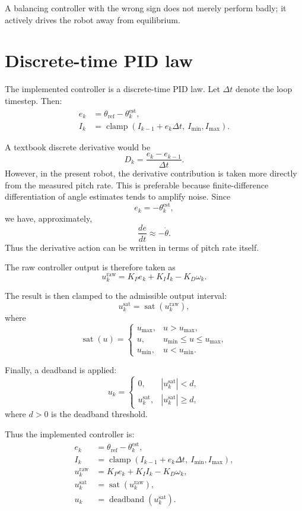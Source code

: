 \documentclass[11pt,a4paper]{article}
\begin{document}
A balancing controller with the wrong sign does not merely perform badly; it actively drives the robot away from equilibrium.

\section{Discrete-time PID law}

The implemented controller is a discrete-time PID law. Let \(\Delta t\) denote the loop timestep. Then:
\begin{align*}
e_k &= \theta_{\mathrm{ref}} - \theta^{\mathrm{est}}_k, \\[4pt]
I_k &= \operatorname{clamp}\!\left(I_{k-1} + e_k \Delta t,\ I_{\min}, I_{\max}\right).
\end{align*}

A textbook discrete derivative would be
\[
D_k = \frac{e_k - e_{k-1}}{\Delta t}.
\]
However, in the present robot, the derivative contribution is taken more directly from the measured pitch rate. This is preferable because finite-difference differentiation of angle estimates tends to amplify noise. Since
\[
e_k = -\theta^{\mathrm{est}}_k,
\]
we have, approximately,
\[
\frac{de}{dt} \approx -\dot{\theta}.
\]
Thus the derivative action can be written in terms of pitch rate itself.

The raw controller output is therefore taken as
\[
u_k^{\mathrm{raw}} = K_P e_k + K_I I_k - K_D \omega_k.
\]

The result is then clamped to the admissible output interval:
\[
u_k^{\mathrm{sat}} = \operatorname{sat}(u_k^{\mathrm{raw}}),
\]
where
\[
\operatorname{sat}(u) =
\begin{cases}
u_{\max}, & u > u_{\max},\\
u, & u_{\min} \le u \le u_{\max},\\
u_{\min}, & u < u_{\min}.
\end{cases}
\]

Finally, a deadband is applied:
\[
u_k =
\begin{cases}
0, & |u_k^{\mathrm{sat}}| < d,\\
u_k^{\mathrm{sat}}, & |u_k^{\mathrm{sat}}| \ge d,
\end{cases}
\]
where \(d>0\) is the deadband threshold.

Thus the implemented controller is:
\[
\boxed{
\begin{aligned}
e_k &= \theta_{\mathrm{ref}} - \theta^{\mathrm{est}}_k,\\
I_k &= \operatorname{clamp}\!\left(I_{k-1} + e_k \Delta t,\ I_{\min}, I_{\max}\right),\\
u_k^{\mathrm{raw}} &= K_P e_k + K_I I_k - K_D \omega_k,\\
u_k^{\mathrm{sat}} &= \operatorname{sat}(u_k^{\mathrm{raw}}),\\
u_k &= \operatorname{deadband}(u_k^{\mathrm{sat}}).
\end{aligned}
}
\]
\end{document}
